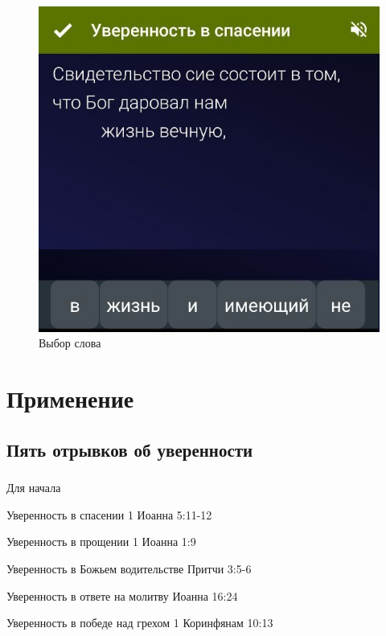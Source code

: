 \documentclass[t,aspectratio=169]{beamer}  %
\begin{document}
\begin{frame}[c]
\begin{multicols}{2}
\begin{center}
\begin{figure}
			\includegraphics[height=0.55\textheight]{remember-me-card-pick}
			\caption{Выбор слова}
			\end{figure}		
		\end{center}
	 \end{multicols}
\end{frame}
\section{Применение}
\subsection{Пять отрывков об уверенности}
\begin{frame}[c]
	\frametitle{\insertsection}
	\framesubtitle{\insertsubsection}
	Для начала
	\begin{multicols}{2}
	\begin{exampleblock}{Уверенность в спасении}\setlength{\textwidth}{0.4\textwidth}
		1 Иоанна 5:11-12
	\end{exampleblock}
	\begin{exampleblock}{Уверенность в прощении}
		1 Иоанна 1:9
	\end{exampleblock}
	\begin{exampleblock}{Уверенность в Божьем водительстве}
		Притчи 3:5-6
	\end{exampleblock}	
	\begin{exampleblock}{Уверенность в ответе на молитву}
		Иоанна 16:24
	\end{exampleblock}	
	\begin{exampleblock}{Уверенность в победе над грехом}
		1 Коринфянам 10:13
	\end{exampleblock}

	\end{multicols}		
\end{frame}
\end{document}
